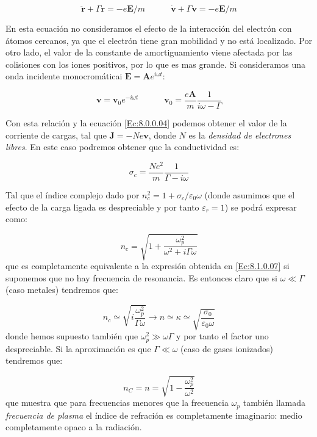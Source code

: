 \documentclass[12pt]{article}
\newcommand{\tquad}{\quad \quad \quad}
\newcommand{\En}{\mathbf{E}}
\newcommand{\Jn}{\mathbf{J}}
\newcommand{\vn}{\mathbf{v}}
\newcommand{\rn}{\mathbf{r}}
\newcommand{\An}{\mathbf{A}}
\numberwithin{equation}{section}
\numberwithin{figure}{section}
\begin{document}
\begin{equation}
\ddot{\rn} + \Gamma \dot{\rn} = - e \En / m \tquad \dot{\vn} + \Gamma \vn = - e \En / m
\end{equation}

En esta ecuación no consideramos el efecto de la interacción del electrón con átomos cercanos, ya que el electrón tiene gran mobilidad y no está localizado. Por otro lado, el valor de la constante de amortiguamiento viene afectada por las colisiones con los iones positivos, por lo que es mas grande. Si consideramos una onda incidente monocromáticai  $\En = \An e^{i \omega t}$:

\begin{equation}
\vn = \vn_0 e^{-i \omega t} \tquad \vn_0 = \dfrac{e \An}{m} \dfrac{1}{i \omega - \Gamma}
\end{equation}

Con esta relación y la ecuación \ref{Ec:8.0.0.04} podemos obtener el valor de la corriente de cargas, tal que $\Jn = - N e \vn$, donde $N$ es la \textit{densidad de electrones libres}. En este caso podremos obtener que la conductividad es:

\begin{equation}
\sigma_c = \dfrac{N e^2}{m} \dfrac{1}{\Gamma-i \omega}
\end{equation}

Tal que el índice complejo dado por $n_c^2 = 1+ \sigma_c/\varepsilon_0 \omega$ (donde asumimos que el efecto de la carga ligada es despreciable y por tanto $\varepsilon_r = 1$) se podrá expresar como:

\begin{equation}
n_c = \sqrt{1+\dfrac{\omega_p^2}{\omega^2+ i \Gamma \omega}}
\end{equation}
que es completamente equivalente a la expresión obtenida en \ref{Ec:8.1.0.07} si suponemos que no hay frecuencia de resonancia. Es entonces claro que si $\omega \ll \Gamma$ (caso metales) tendremos que:

\begin{equation}
n_c \simeq \sqrt{i \dfrac{\omega^2_p}{\Gamma \omega}} \longrightarrow n \simeq \kappa \simeq \sqrt{\dfrac{\sigma_0}{\varepsilon_0 \omega}}
\end{equation}
donde hemos supuesto también que $\omega_p^2 \gg \omega \Gamma$ y por tanto el factor uno despreciable. Si la aproximación es que $\Gamma \ll \omega$ (caso de gases ionizados) tendremos que:

\begin{equation}
n_C = n = \sqrt{1-\dfrac{\omega^2_p}{\omega^2}}
\end{equation}
que muestra que para frecuencias menores que la frecuencia $\omega_p$ también llamada \textit{frecuencia de plasma} el índice de refración es completamente imaginario: medio completamente opaco a la radiación.
\end{document}
